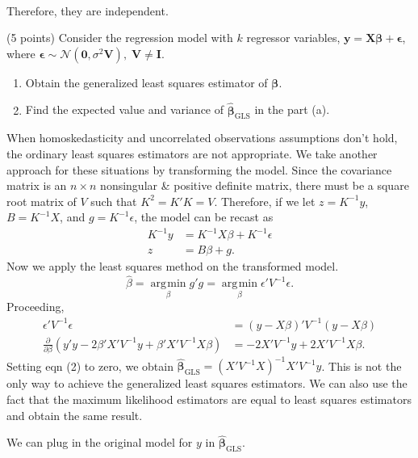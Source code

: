 \documentclass[answers]{exam}
\DeclareMathOperator{\argmin}{\arg\!\min}
\newcommand{\bs}{\boldsymbol}
\begin{document}
\begin{questions}
\begin{solution}
\begin{align*}
   \end{align*}
   Therefore, they are independent.
   \end{solution}
   \question
   (5 points) Consider the regression model with $k$ regressor variables, $\bs{y}=\bs{X\beta} + \bs{\epsilon}$, where $\bs{\epsilon} \sim \mathcal{N}\left(\bs{0},\sigma^{2}\bs{V}\right), \; \bs{V}\neq \bs{I}$.
   \begin{enumerate}[label=(\alph*)]
      \item Obtain the generalized least squares estimator of $\bs{\beta}$.
      \item Find the expected value and variance of $\hat{\bs{\beta}}_{\text{GLS}}$ in the part (a).
   \end{enumerate}
   \begin{solution}
      When homoskedasticity and uncorrelated observations assumptions don't hold, the ordinary least squares estimators are not appropriate. We take another approach for these situations by transforming the model. Since the covariance matrix is an $n\times n$ nonsingular \& positive definite matrix, there must be a square root matrix of $V$ such that $K^{2} = K'K = V$. Therefore, if we let $z = K^{-1}y$, $B = K^{-1}X$, and $g = K^{-1}\epsilon$, the model can be recast as
      \begin{align*}
         K^{-1}y &= K^{-1}X\beta + K^{-1}\epsilon\\
         z &= B\beta + g.
      \end{align*}
      Now we apply the least squares method on the transformed model.
      $$
         \hat{\beta} = \argmin\limits_{\beta} g'g = \argmin\limits_{\beta} \epsilon'V^{-1}\epsilon.
      $$
      Proceeding,
      \begin{align}
         \epsilon'V^{-1}\epsilon &= \left(y-X\beta\right)'V^{-1}\left(y-X\beta\right)\\
         \frac{\partial}{\partial \beta} \left( y'y -2\beta'X'V^{-1}y + \beta'X'V^{-1}X\beta\right) &= -2X'V^{-1}y + 2X'V^{-1}X\beta.
      \end{align}
      Setting eqn (2) to zero, we obtain $\hat{\bs{\beta}}_{\text{GLS}} = \left(X'V^{-1}X\right)^{-1}X'V^{-1}y$. This is not the only way to achieve the generalized least squares estimators. We can also use the fact that the maximum likelihood estimators are equal to least squares estimators and obtain the same result.
   \end{solution}
   \begin{solution}
      We can plug in the original model for $y$ in $\hat{\bs{\beta}}_{\text{GLS}}$.

\end{solution}
\end{questions}
\end{document}
